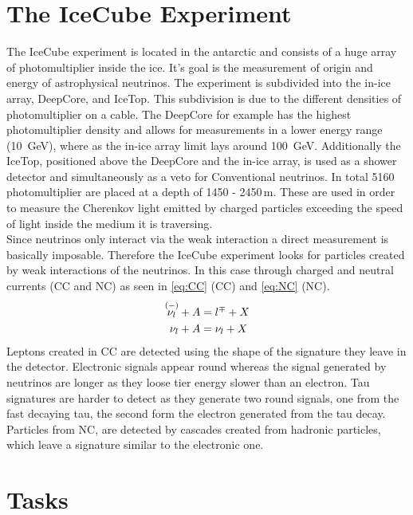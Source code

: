 \section{The IceCube Experiment}
\label{sec:The_IceCube_Experiment}
The IceCube experiment is located in the antarctic and consists of a huge array of photomultiplier inside the ice. 
It's goal is the measurement of origin and energy of astrophysical neutrinos.
The experiment is subdivided into the in-ice array, DeepCore, and IceTop. 
This subdivision is due to the different densities of photomultiplier on a cable. 
The DeepCore for example has the highest photomultiplier density and allows for measurements in a lower energy 
range (\qty{10}{\giga\eV}), where as the in-ice array limit lays around \qty{100}{\giga\eV}.
Additionally the IceTop, positioned above the DeepCore and the in-ice array, 
is used as a shower detector and simultaneously as a veto for Conventional neutrinos.
In total 5160 photomultiplier are placed at a depth of 1450 - 2450\,\unit{\meter}. 
These are used in order to measure the Cherenkov light emitted by charged particles exceeding the speed of light inside the medium it is traversing. \\

Since neutrinos only interact via the weak interaction a direct measurement is basically imposable. 
Therefore the IceCube experiment looks for particles created by weak interactions of the neutrinos. 
In this case through charged and neutral currents (CC and NC) as seen in \autoref{eq:CC} (CC) and \autoref{eq:NC} (NC).
\begin{align}
	\overset{(-)}{\nu_l} + A &= l^\mp + X \label{eq:CC}\\
	\nu_l + A &= \nu_l + X \label{eq:NC}	
\end{align}
Leptons created in CC are detected using the shape of the signature they leave in the detector. 
Electronic signals appear round whereas the signal generated by neutrinos 
are longer as they loose tier energy slower than an electron. 
Tau signatures are harder to detect as they generate two round signals, 
one from the fast decaying tau, the second form the electron generated from the tau decay.
Particles from NC, are detected by cascades created from hadronic particles, 
which leave a signature similar to the electronic one.\\


\section{Tasks}
\label{sec:Tasks}
